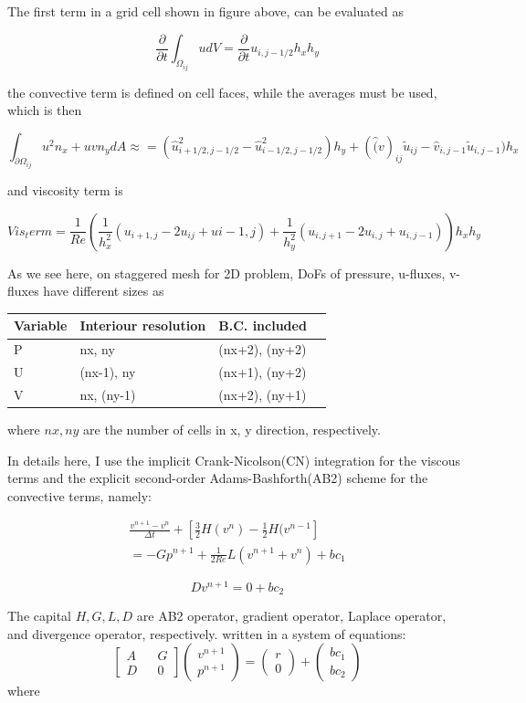 \documentclass[11pt]{article}
\begin{document}
The first term in a grid cell shown in figure above, can be evaluated as

$$  \frac{\partial}{\partial t} \int _{\Omega _{ij}} u dV = \frac{\partial}{\partial t} u_{i,j-1/2} h_x h_y $$

the convective term is defined on cell faces, while the averages must be used, which is then

$$  \int_{\partial \Omega_{ij}} u^2 n_x + u v n_y dA \approx = (\hat{u}_{i+1/2, j-1/2} ^ 2 - \hat{u}_{i-1/2, j-1/2}^2) h_y + ( \hat(v)_{ij} \tilde{u}_{ij} - \hat{v}_{i,j-1} \tilde{u}_{i,j-1}) h_x $$

and viscosity term is

$$ Vis_term = \frac{1}{Re}( \frac{1}{h_x^2} (u_{i+1,j} - 2u_{ij} + u{i-1,j}) + \frac{1}{h_y^2}( u_{i,j+1} - 2u_{i,j} + u_{i,j-1}) ) h_x h_y $$

As we see here, on staggered mesh for 2D problem, DoFs of pressure, u-fluxes, v-fluxes have different sizes as

\begin{center}
	\begin{tabular}{|l |l |l |l|}
	\hline
	Variable & Interiour resolution & B.C. included \\ \hline
	P	&  nx, ny & (nx+2), (ny+2) \\ \hline
	U	&  (nx-1), ny & (nx+1), (ny+2) \\ \hline
 	V	&  nx, (ny-1) & (nx+2), (ny+1) \\ 
	\hline
	\end{tabular}
\end{center}
  
where $nx,ny$ are the number of cells in x, y direction, respectively.

In details here, I use the implicit Crank-Nicolson(CN) integration for the viscous terms and the explicit second-order Adams-Bashforth(AB2) scheme for the convective terms, namely:

\begin{align*}
  \frac{v^{n+1} - v^n}{\Delta t} + [\frac{3}{2} H(v^n) - \frac{1}{2} H(v^{n-1}] \\
 = -G p^{n+1} + \frac{1}{2Re} L(v^{n+1} + v^n) + bc_1 
\end{align*}

$$ D v^{n+1} = 0 + bc_2 $$

The capital $H, G, L, D$ are AB2 operator, gradient operator, Laplace operator, and divergence operator, respectively. written in a system of equations:
$$ 
\begin{bmatrix} A && G \\ D && 0 \end{bmatrix} \begin{pmatrix} v^{n+1} \\ p^{n+1} \end{pmatrix} = \left( \begin{array}{c} r \\ 0 \end{array} \right) + \left ( \begin{array}{c} bc_1 \\ bc_2 \end{array} \right) $$
where
\end{document}
